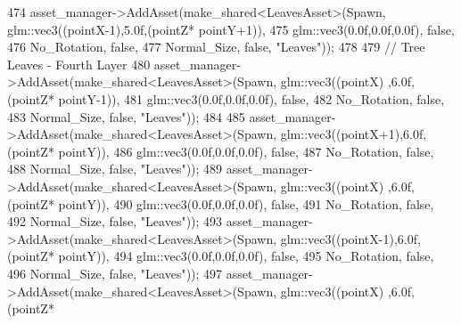 \begin{DoxyCode}
474             asset\_manager->AddAsset(make\_shared<LeavesAsset>(Spawn, glm::vec3((pointX-1),5.0f,(pointZ*
      pointY+1)),
475                                                              glm::vec3(0.0f,0.0f,0.0f), \textcolor{keyword}{false},
476                                                              No\_Rotation, \textcolor{keyword}{false},
477                                                              Normal\_Size, \textcolor{keyword}{false}, \textcolor{stringliteral}{"Leaves"}));
478 
479             \textcolor{comment}{// Tree Leaves - Fourth Layer}
480             asset\_manager->AddAsset(make\_shared<LeavesAsset>(Spawn, glm::vec3((pointX)  ,6.0f,(pointZ*
      pointY-1)),
481                                                              glm::vec3(0.0f,0.0f,0.0f), \textcolor{keyword}{false},
482                                                              No\_Rotation, \textcolor{keyword}{false},
483                                                              Normal\_Size, \textcolor{keyword}{false}, \textcolor{stringliteral}{"Leaves"}));
484 
485             asset\_manager->AddAsset(make\_shared<LeavesAsset>(Spawn, glm::vec3((pointX+1),6.0f,(pointZ*
      pointY)),
486                                                              glm::vec3(0.0f,0.0f,0.0f), \textcolor{keyword}{false},
487                                                              No\_Rotation, \textcolor{keyword}{false},
488                                                              Normal\_Size, \textcolor{keyword}{false}, \textcolor{stringliteral}{"Leaves"}));
489             asset\_manager->AddAsset(make\_shared<LeavesAsset>(Spawn, glm::vec3((pointX)  ,6.0f,(pointZ*
      pointY)),
490                                                              glm::vec3(0.0f,0.0f,0.0f), \textcolor{keyword}{false},
491                                                              No\_Rotation, \textcolor{keyword}{false},
492                                                              Normal\_Size, \textcolor{keyword}{false}, \textcolor{stringliteral}{"Leaves"}));
493             asset\_manager->AddAsset(make\_shared<LeavesAsset>(Spawn, glm::vec3((pointX-1),6.0f,(pointZ*
      pointY)),
494                                                              glm::vec3(0.0f,0.0f,0.0f), \textcolor{keyword}{false},
495                                                              No\_Rotation, \textcolor{keyword}{false},
496                                                              Normal\_Size, \textcolor{keyword}{false}, \textcolor{stringliteral}{"Leaves"}));
497             asset\_manager->AddAsset(make\_shared<LeavesAsset>(Spawn, glm::vec3((pointX)  ,6.0f,(pointZ*

\end{DoxyCode}
